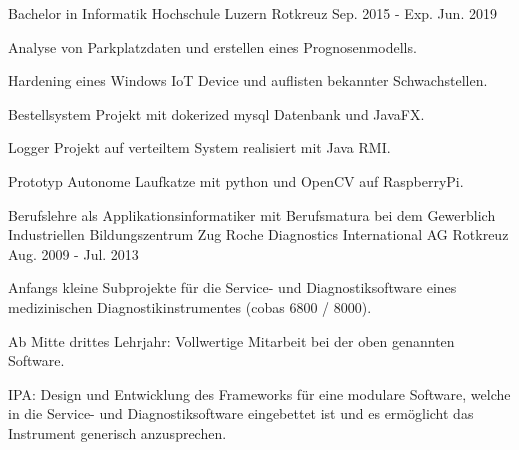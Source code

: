 

\begin{cventries}

\cventry
{Bachelor in Informatik} %
{Hochschule Luzern} %
{Rotkreuz} %
{Sep. 2015 - Exp. Jun. 2019} %
{
    \begin{cvitems} %
        \item {Analyse von Parkplatzdaten und erstellen eines Prognosenmodells.}
        \item {Hardening eines Windows IoT Device und auflisten bekannter Schwachstellen.}
        \item {Bestellsystem Projekt mit dokerized mysql Datenbank und JavaFX.}
        \item {Logger Projekt auf verteiltem System realisiert mit Java RMI.}
        \item {Prototyp Autonome Laufkatze mit python und OpenCV auf RaspberryPi.}
    \end{cvitems}
}

\cventry
{Berufslehre als Applikationsinformatiker mit Berufsmatura bei dem Gewerblich Industriellen Bildungszentrum Zug} %
{Roche Diagnostics International AG} %
{Rotkreuz} %
{Aug. 2009 - Jul. 2013} %
{
    \begin{cvitems} %
        \item {Anfangs kleine Subprojekte für die Service- und Diagnostiksoftware eines medizinischen Diagnostikinstrumentes (cobas 6800 / 8000).}
        \item {Ab Mitte drittes Lehrjahr: Vollwertige Mitarbeit bei der oben genannten Software.}
        \item {IPA: Design und Entwicklung des Frameworks für eine modulare Software, welche in die Service- und Diagnostiksoftware eingebettet ist und es ermöglicht das Instrument generisch anzusprechen.}
    \end{cvitems}
}

\end{cventries}
